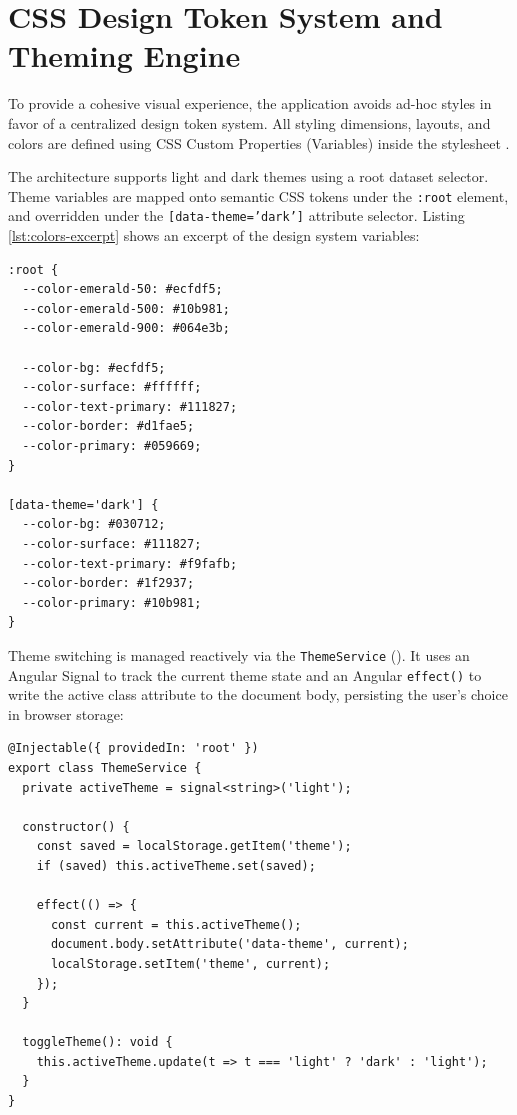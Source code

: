 \section{CSS Design Token System and Theming Engine}
To provide a cohesive visual experience, the application avoids ad-hoc styles in favor of a centralized design token system. All styling dimensions, layouts, and colors are defined using CSS Custom Properties (Variables) inside the  stylesheet \cite{mdnCssCustomProperties}. 

The architecture supports light and dark themes using a root dataset selector. Theme variables are mapped onto semantic CSS tokens under the \texttt{:root} element, and overridden under the \texttt{[data-theme='dark']} attribute selector. Listing \ref{lst:colors-excerpt} shows an excerpt of the design system variables:

\begin{lstlisting}[caption={Color Design Token overrides for Light and Dark themes}, label={lst:colors-excerpt}]
:root {
  --color-emerald-50: #ecfdf5;
  --color-emerald-500: #10b981;
  --color-emerald-900: #064e3b;
  
  --color-bg: #ecfdf5;
  --color-surface: #ffffff;
  --color-text-primary: #111827;
  --color-border: #d1fae5;
  --color-primary: #059669;
}

[data-theme='dark'] {
  --color-bg: #030712;
  --color-surface: #111827;
  --color-text-primary: #f9fafb;
  --color-border: #1f2937;
  --color-primary: #10b981;
}
\end{lstlisting}

Theme switching is managed reactively via the \texttt{ThemeService} (). It uses an Angular Signal to track the current theme state and an Angular \texttt{effect()} to write the active class attribute to the document body, persisting the user's choice in browser storage:

\begin{lstlisting}
@Injectable({ providedIn: 'root' })
export class ThemeService {
  private activeTheme = signal<string>('light');

  constructor() {
    const saved = localStorage.getItem('theme');
    if (saved) this.activeTheme.set(saved);
    
    effect(() => {
      const current = this.activeTheme();
      document.body.setAttribute('data-theme', current);
      localStorage.setItem('theme', current);
    });
  }

  toggleTheme(): void {
    this.activeTheme.update(t => t === 'light' ? 'dark' : 'light');
  }
}
\end{lstlisting}

